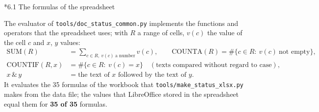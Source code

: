 \documentclass[10pt,a4paper]{article}
\makeatletter
\renewcommand\subsection{\@startsection{subsection}{2}{\z@}{-3.25ex\@plus -1ex \@minus -.2ex}{1.5ex \@plus .2ex}{\normalfont\large\bfseries\raggedright}}
\makeatother
\begin{document}
\subsection*{6.1 The formulas of the spreadsheet}
The evaluator of \texttt{tools/\allowbreak{}doc\_\allowbreak{}status\_\allowbreak{}common.py} implements the functions and operators that the spreadsheet uses; with $R$ a range of cells, $v(c)$ the value of the cell $c$ and $x$, $y$ values:
\begin{align*}
\mathrm{SUM}(R)&=\sum_{c\in R,\ v(c)\ \text{a number}}v(c),\qquad \mathrm{COUNTA}(R)=\#\{c\in R:\ v(c)\ \text{not empty}\}, \\
\mathrm{COUNTIF}(R,x)&=\#\{c\in R:\ v(c)=x\}\quad(\text{texts compared without regard to case}), \\
x\,\&\,y&=\text{the text of }x\text{ followed by the text of }y .
\end{align*}
It evaluates the 35 formulas of the workbook that \texttt{tools/\allowbreak{}make\_\allowbreak{}status\_\allowbreak{}xlsx.py} makes from the data file; the values that LibreOffice stored in the spreadsheet equal them for \textbf{35 of 35} formulas.
\end{document}
